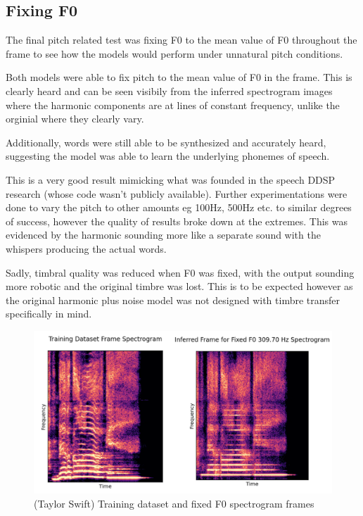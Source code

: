\subsection{Fixing F0}

The final pitch related test was fixing F0 to the mean value of F0 throughout the frame to see how the models would perform under unnatural pitch conditions.

Both models were able to fix pitch to the mean value of F0 in the frame. This is clearly heard and can be seen visibily from the inferred spectrogram images where the harmonic components are at lines of constant frequency, unlike the orginial where they clearly vary.

Additionally, words were still able to be synthesized and accurately heard, suggesting the model was able to learn the underlying phonemes of speech.

This is a very good result mimicking what was founded in the speech DDSP research\cite{SpeechDDSP} (whose code wasn't publicly available). Further experimentations were done to vary the pitch to other amounts eg 100Hz, 500Hz etc. to similar degrees of success, however the quality of results broke down at the extremes. This was evidenced by the harmonic sounding more like a separate sound with the whispers producing the actual words.

Sadly, timbral quality was reduced when F0 was fixed, with the output sounding more robotic and the original timbre was lost. This is to be expected however as the original harmonic plus noise model was not designed with timbre transfer specifically in mind\cite{OriginalDDSP}.

\begin{figure}
    \centering
    \includegraphics[width=\textwidth]{research/results/TaylorSwift/FixedF0.png}
    \caption{(Taylor Swift) Training dataset and fixed F0 spectrogram frames}
\end{figure}

